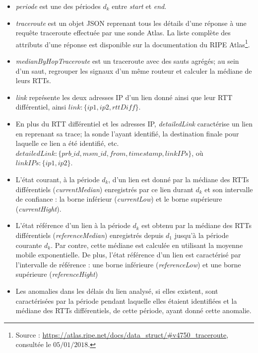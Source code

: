 \begin{itemize}
	\item \textit{periode} est une des périodes $d_k$ entre \textit{start} et \textit{end}. 
	
	\item \textit{traceroute} est un objet JSON reprenant tous les détails d'une réponse à une requête traceroute effectuée par une sonde Atlas. La liste complète des attributs d'une réponse est disponible sur la documentation du RIPE Atlas\footnote{Source : \url{https://atlas.ripe.net/docs/data_struct/\#v4750_traceroute}, consultée le $05/01/2018$.}.
	
	\item  \textit{medianByHopTraceroute} est un traceroute avec des sauts  agrégés; au sein d'un saut, regrouper les signaux d'un même routeur et calculer la médiane de leurs RTTs.
	
	\item  \textit{link}  représente les deux adresses IP d'un lien donné ainsi que leur RTT différentiel, ainsi  $ link : \{ip1, ip2, rttDiff\} $.
	
	\item En plus du RTT différentiel et les adresses IP, \textit{detailedLink} caractérise un lien en reprenant sa trace; la sonde l'ayant identifié, la destination finale pour  laquelle ce lien a été identifié, etc. $ detailedLink :\{prb\_id, msm\_id, from, timestamp, linkIPs\} $, où $ linkIPs: \{ip1, ip2\} $.
	
	\item L'état courant, à la période $d_k$, d'un lien est donné par la médiane des  RTTs différentiels (\textit{currentMedian}) enregistrés par ce lien durant $d_k$ et  son intervalle de confiance : la borne inférieur (\textit{currentLow}) et  le borne supérieure (\textit{currentHight}).  
	
	\item L'état référence d'un lien à la période $d_k$ est  obtenu par la médiane des RTTs différentiels (\textit{referenceMedian}) enregistrés depuis $d_1$ jusqu'à la période courante $d_k$. Par contre, cette médiane est calculée en utilisant la moyenne mobile exponentielle. De plus, l'état référence d'un lien est caractérisé par l'intervalle de référence : une borne inférieure (\textit{referenceLow}) et une borne supérieure (\textit{referenceHight})
	
	\item Les anomalies dans les délais du lien analysé, si elles existent, sont caractérisées par la période pendant laquelle elles étaient identifiées et la médiane des RTTs différentiels, de cette période, ayant donné cette anomalie.
\end{itemize} 

